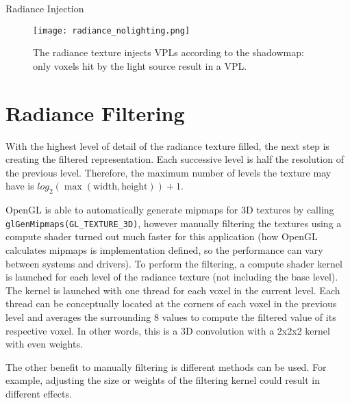 \begin{algorithm}
    \caption{Radiance Injection}
    \label{alg:radianceinjection}
    \begin{algorithmic}
         
         
        \EndFor
    \end{algorithmic}
\end{algorithm}

\begin{figure}[h!]
\centering
    \texttt{[image: radiance\_nolighting.png]}
    \caption{The radiance texture injects VPLs according to the shadowmap: only voxels hit by the light source result in a VPL.}
    \label{fig:radiance}
\end{figure}

\section{Radiance Filtering}
With the highest level of detail of the radiance texture filled, the next step is creating the filtered representation. Each successive level is half the resolution of the previous level. Therefore, the maximum number of levels the texture may have is $log_2 (\max (\text{width}, \text{height})) + 1$.

OpenGL is able to automatically generate mipmaps for 3D textures by calling \verb#glGenMipmaps(GL_TEXTURE_3D)#, however manually filtering the textures using a compute shader turned out much faster for this application (how OpenGL calculates mipmaps is implementation defined, so the performance can vary between systems and drivers). To perform the filtering, a compute shader kernel is launched for each level of the radiance texture (not including the base level). The kernel is launched with one thread for each voxel in the current level. Each thread can be conceptually located at the corners of each voxel in the previous level and averages the surrounding 8 values to compute the filtered value of its respective voxel. In other words, this is a 3D convolution with a 2x2x2 kernel with even weights.

The other benefit to manually filtering is different methods can be used. For example, adjusting the size or weights of the filtering kernel could result in different effects.

